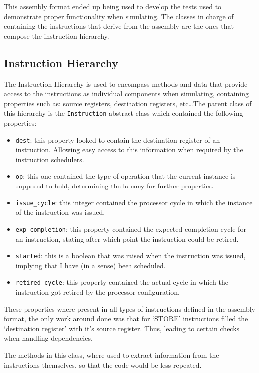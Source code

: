 \documentclass{article}
\begin{document}
This assembly format ended up being used to develop the tests used to demonstrate proper functionality when simulating. The classes in charge of containing the instructions that derive from the assembly are the ones that compose the instruction hierarchy.

\subsection{Instruction Hierarchy}
The Instruction Hierarchy is used to encompass methods and data that provide access to the instructions as individual components when simulating, containing properties such as: source registers, destination registers, etc\ldots The parent class of this hierarchy is the \lstinline|Instruction| abstract class which contained the following properties:

\begin{itemize}
    \item \lstinline|dest|: this property looked to contain the destination register of an instruction. Allowing easy access to this information when required by the instruction schedulers.
    \item \lstinline|op|: this one contained the type of operation that the current instance is supposed to hold, determining the latency for further properties.
    \item \lstinline|issue_cycle|: this integer contained the processor cycle in which the instance of the instruction was issued.
    \item \lstinline|exp_completion|: this property contained the expected completion cycle for an instruction, stating after which point the instruction could be retired. 
    \item \lstinline|started|: this is a boolean that was raised when the instruction was issued, implying that I have (in a sense) been scheduled. 
    \item \lstinline|retired_cycle|: this property contained the actual cycle in which the instruction got retired by the processor configuration.
\end{itemize}

These properties where present in all types of instructions defined in the assembly format, the only work around done was that for `STORE' instructions filled the `destination register' with it's source register. Thus, leading to certain checks when handling dependencies.

The methods in this class, where used to extract information from the instructions themselves, so that the code would be less repeated. 
\end{document}
